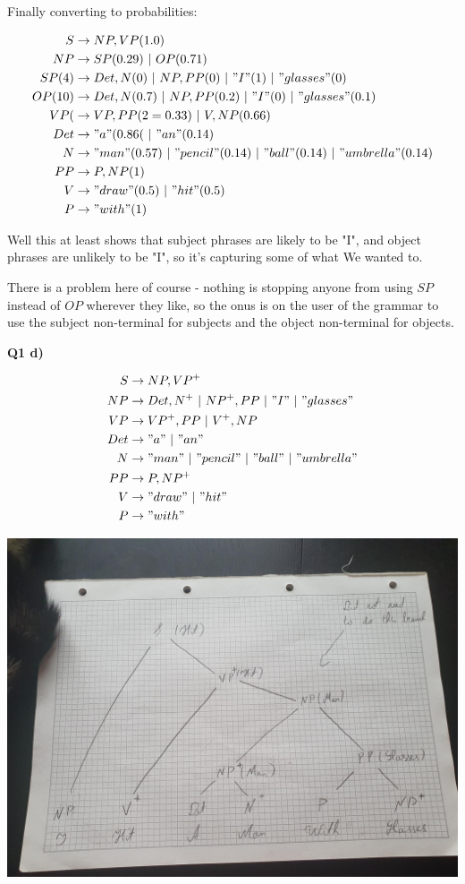 \documentclass{article}
\newcommand*\OR{\ |\ }
\begin{document}
	Finally converting to probabilities:
	
	\begin{align}
		S &\to NP, VP (1.0)\\
		NP &\to SP (0.29)\OR  OP (0.71)\\
		SP (4) &\to Det, N (0) \OR NP, PP (0)\OR "I" (1) \OR "glasses" (0)\\
		OP (10)&\to  Det, N (0.7) \OR NP, PP (0.2)\OR "I" (0)\OR "glasses" (0.1)\\
		VP (&\to VP, PP (2=0.33)\OR V, NP (0.66)\\		
		Det &\to "a" (0.86( \OR "an"(0.14)\\
		N &\to "man" (0.57)\OR "pencil"(0.14) \OR "ball"(0.14) \OR "umbrella"(0.14)\\
		PP &\to P, NP (1)\\
		V &\to "draw" (0.5) \OR "hit"(0.5)\\
		P &\to "with" (1) 
	\end{align}
	
	Well this at least shows that subject phrases are likely to be "I", and object phrases are unlikely to be "I", so it's capturing some of what We wanted to. 
	
	There is a problem here of course - nothing is stopping anyone from using $SP$ instead of $OP$ wherever they like, so the onus is on the user of the grammar to use the subject non-terminal for subjects and the object non-terminal for objects.
	
\textbf{Q1 d)}
	
	\begin{align}
		S &\to NP, VP^+\\
		NP &\to Det, N^+ \OR NP^+, PP \OR "I" \OR "glasses"\\
		VP &\to VP^+, PP \OR V^+, NP\\		
		Det &\to "a" \OR "an"\\
		N &\to "man" \OR "pencil" \OR "ball" \OR "umbrella"\\
		PP &\to P, NP^+\\
		V &\to "draw" \OR "hit"\\
		P &\to "with" 
	\end{align}
	
	\includegraphics[angle=90,origin=c,width=\textwidth]{figures/headed_parse_tree}
	
\end{document}
